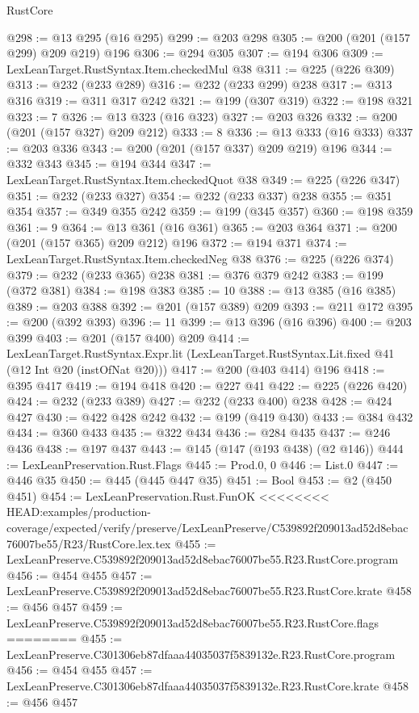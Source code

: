 \begin{lexlean}{RustCore}
\begin{coremodule}
{\begin{coremodule}
{{{{{@298 := @13 @295 (@16 @295)
@299 := @203 @298
@305 := @200 (@201 (@157 @299) @209 @219) @196
@306 := @294 @305
@307 := @194 @306
@309 := LexLeanTarget.RustSyntax.Item.checkedMul @38
@311 := @225 (@226 @309)
@313 := @232 (@233 @289)
@316 := @232 (@233 @299) @238
@317 := @313 @316
@319 := @311 @317 @242
@321 := @199 (@307 @319)
@322 := @198 @321
@323 := 7
@326 := @13 @323 (@16 @323)
@327 := @203 @326
@332 := @200 (@201 (@157 @327) @209 @212)
@333 := 8
@336 := @13 @333 (@16 @333)
@337 := @203 @336
@343 := @200 (@201 (@157 @337) @209 @219) @196
@344 := @332 @343
@345 := @194 @344
@347 := LexLeanTarget.RustSyntax.Item.checkedQuot @38
@349 := @225 (@226 @347)
@351 := @232 (@233 @327)
@354 := @232 (@233 @337) @238
@355 := @351 @354
@357 := @349 @355 @242
@359 := @199 (@345 @357)
@360 := @198 @359
@361 := 9
@364 := @13 @361 (@16 @361)
@365 := @203 @364
@371 := @200 (@201 (@157 @365) @209 @212) @196
@372 := @194 @371
@374 := LexLeanTarget.RustSyntax.Item.checkedNeg @38
@376 := @225 (@226 @374)
@379 := @232 (@233 @365) @238
@381 := @376 @379 @242
@383 := @199 (@372 @381)
@384 := @198 @383
@385 := 10
@388 := @13 @385 (@16 @385)
@389 := @203 @388
@392 := @201 (@157 @389) @209
@393 := @211 @172
@395 := @200 (@392 @393)
@396 := 11
@399 := @13 @396 (@16 @396)
@400 := @203 @399
@403 := @201 (@157 @400) @209
@414 := LexLeanTarget.RustSyntax.Expr.lit
    (LexLeanTarget.RustSyntax.Lit.fixed @41 (@12 Int @20 (instOfNat @20)))
@417 := @200 (@403 @414) @196
@418 := @395 @417
@419 := @194 @418
@420 := @227 @41
@422 := @225 (@226 @420)
@424 := @232 (@233 @389)
@427 := @232 (@233 @400) @238
@428 := @424 @427
@430 := @422 @428 @242
@432 := @199 (@419 @430)
@433 := @384 @432
@434 := @360 @433
@435 := @322 @434
@436 := @284 @435
@437 := @246 @436
@438 := @197 @437
@443 := @145 (@147 (@193 @438) (@2 @146))
@444 := LexLeanPreservation.Rust.Flags
@445 := Prod.{0, 0}
@446 := List.{0}
@447 := @446 @35
@450 := @445 (@445 @447 @35)
@451 := Bool
@453 := @2 (@450 @451)
@454 := LexLeanPreservation.Rust.FunOK
<<<<<<<< HEAD:examples/production-coverage/expected/verify/preserve/LexLeanPreserve/C539892f209013ad52d8ebac76007be55/R23/RustCore.lex.tex
@455 := LexLeanPreserve.C539892f209013ad52d8ebac76007be55.R23.RustCore.program
@456 := @454 @455
@457 := LexLeanPreserve.C539892f209013ad52d8ebac76007be55.R23.RustCore.krate
@458 := @456 @457
@459 := LexLeanPreserve.C539892f209013ad52d8ebac76007be55.R23.RustCore.flags
========
@455 := LexLeanPreserve.C301306eb87dfaaa44035037f5839132e.R23.RustCore.program
@456 := @454 @455
@457 := LexLeanPreserve.C301306eb87dfaaa44035037f5839132e.R23.RustCore.krate
@458 := @456 @457
}}}}}
\end{coremodule}}
\end{coremodule}
\end{lexlean}
